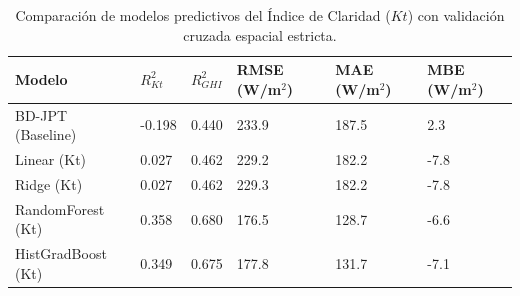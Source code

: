 \begin{table}[htpb]
\centering
\caption{Comparación de modelos predictivos del Índice de Claridad ($Kt$) con validación cruzada espacial estricta.}
\label{tab:bdjpt_models}
\begin{tabular}{llllll}
\toprule
Modelo & $R^2_{Kt}$ & $R^2_{GHI}$ & RMSE (W/m$^2$) & MAE (W/m$^2$) & MBE (W/m$^2$) \\
\midrule
BD-JPT (Baseline) & -0.198 & 0.440 & 233.9 & 187.5 & 2.3 \\
Linear (Kt) & 0.027 & 0.462 & 229.2 & 182.2 & -7.8 \\
Ridge (Kt) & 0.027 & 0.462 & 229.3 & 182.2 & -7.8 \\
RandomForest (Kt) & 0.358 & 0.680 & 176.5 & 128.7 & -6.6 \\
HistGradBoost (Kt) & 0.349 & 0.675 & 177.8 & 131.7 & -7.1 \\
\bottomrule
\end{tabular}
\end{table}